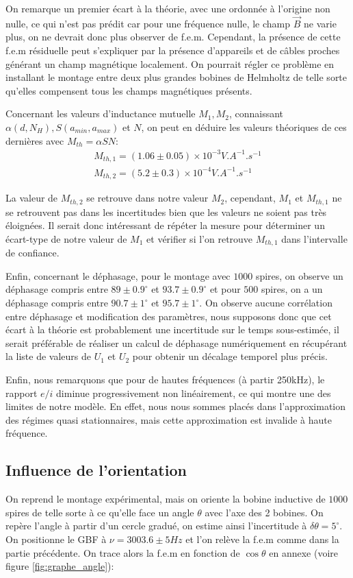 \documentclass[11pt]{article}
\begin{document}
On remarque un premier écart à la théorie, avec une ordonnée à l'origine non nulle, ce qui n'est pas prédit car pour une fréquence nulle, le champ $\vec{B}$
ne varie plus, on ne devrait donc plus observer de f.e.m. Cependant, la présence de cette f.e.m résiduelle peut s'expliquer par la présence d'appareils et de câbles proches
générant un champ magnétique localement. On pourrait régler ce problème en installant le montage entre deux plus grandes bobines de Helmholtz de telle sorte
qu'elles compensent tous les champs magnétiques présents.

Concernant les valeurs d'inductance mutuelle $M_1, M_2$, connaissant $\alpha (d, N_H), S (a_{min}, a_{max})$ et $N$, on peut en déduire les valeurs 
théoriques de ces dernières avec $M_{th} = \alpha S N$:
\begin{align*}
  M_{th,1} = (1.06 \pm 0.05) \times 10^{-3} V.A^{-1}.s^{-1} \\
  M_{th,2} = (5.2 \pm 0.3) \times 10^{-4} V.A^{-1}.s^{-1}
\end{align*}

La valeur de $M_{th,2}$ se retrouve dans notre valeur $M_2$, cependant, $M_1$ et $M_{th,1}$ ne se retrouvent pas dans les incertitudes bien que les valeurs ne soient pas 
très éloignées. Il serait donc intéressant de répéter la mesure pour déterminer un écart-type de notre valeur de $M_1$ et vérifier si l'on retrouve $M_{th,1}$ dans l'intervalle de confiance.

Enfin, concernant le déphasage, pour le montage avec $1000$ spires, on observe un déphasage compris entre $89 \pm 0.9 ^{\circ}$ et $93.7 \pm 0.9 ^{\circ}$ et pour $500$ spires, on a 
un déphasage compris entre $90.7 \pm 1 ^\circ$ et $95.7 \pm 1 ^\circ$. On observe aucune corrélation entre déphasage et modification des paramètres, nous supposons donc 
que cet écart à la théorie est probablement une incertitude sur le temps sous-estimée, il serait préférable de réaliser un calcul de déphasage numériquement en récupérant
la liste de valeurs de $U_1$ et $U_2$ pour obtenir un décalage temporel plus précis.

Enfin, nous remarquons que pour de hautes fréquences (à partir 250kHz), le rapport $e/i$ diminue progressivement non linéairement, ce qui montre une des limites de notre modèle. En effet, nous nous sommes placés
dans l'approximation des régimes quasi stationnaires, mais cette approximation est invalide à haute fréquence.


\break
\subsection{Influence de l'orientation}
On reprend le montage expérimental, mais on oriente la bobine inductive de $1000$ spires de telle sorte à ce qu'elle face un angle $\theta$ avec l'axe des 2 bobines.
On repère l'angle à partir d'un cercle gradué, on estime ainsi l'incertitude à $\delta \theta = 5^{\circ}$. On positionne le GBF à $\nu = 3003.6 \pm 5 Hz$ et l'on relève la f.e.m
comme dans la partie précédente. On trace alors la f.e.m en fonction de $\cos \theta$ en annexe (voire figure \ref{fig:graphe_angle}):
\end{document}
